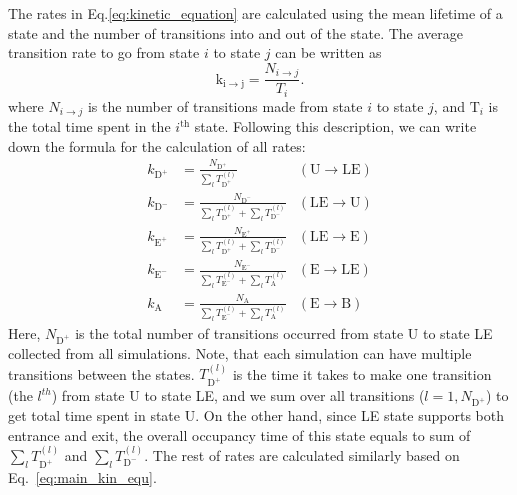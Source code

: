 \documentclass[../talant.diss.submit.tex]{subfiles}
\begin{document}
The rates in Eq.\ref{eq:kinetic_equation} are calculated using the mean lifetime of a state and the number
of transitions into and out of the state. 
The average transition rate to go from state $i$ to state $j$ can be written as 
%
\begin{equation}
  \label{eq:main_kin_equ}
  \mathrm{k_{i \rightarrow j}} = %
  \frac{N_{i \rightarrow j}}{T_i}.
\end{equation}
where $N_{i \rightarrow j}$ is the number of transitions made from state $i$ to state $j$,
and $\mathrm{T}_{i}$ is the total time spent in the $i^\mathrm{th}$ state. 
Following this description, we can write down the formula for the calculation of all rates:
%
\begin{align}
  \label{eq:Dplus}
  k_{\mathrm{D^{+}}} &= \frac{N_{\mathrm{D}^{+}}}{\sum_l T_{\mathrm{D}^+}^{(l)}}
  & (\mathrm{U \rightarrow LE}) \\%
  \label{eq:Dminus}
  k_{\mathrm{{D^{-}}}} &= \frac{N_{\mathrm{D}^{-}}}{\sum_l T_{\mathrm{D}^+}^{(l)} +
    \sum_l T_{\mathrm{D}^-}^{(l)}}
  & (\mathrm{LE \rightarrow U})\\    %
  \label{eq:Eplus}
  k_{\mathrm{E^{+}}} &= \frac{N_{\mathrm{E}^{+}}}{\sum_l T_{\mathrm{D}^+}^{(l)} +
    \sum_l T_{\mathrm{D}^-}^{(l)}}
  &  (\mathrm{LE \rightarrow E}) \\ %
  \label{eq:Eminus}
  k_{\mathrm{{E^{-}}}}  &= \frac{N_{\mathrm{E}^{-}}}{\sum_l T_{\mathrm{E}^{-}}^{(l)} +
    \sum_l T_{\mathrm{A}}^{(l)}}
  & (\mathrm{E \rightarrow LE})\\  %
  \label{eq:A}
  k_{\mathrm{{A}}} &=  \frac{N_{\mathrm{A}}}{\sum_l T_{\mathrm{E}^{-}}^{(l)} +
    \sum_l T_{\mathrm{A}}^{(l)}}
  & (\mathrm{E \rightarrow B}) %
\end{align}
%
Here, $N_{\mathrm{D}^+}$ is the total number of transitions occurred from state U to state LE collected
from all simulations. Note, that each simulation can have multiple transitions between the states.
$T_{\mathrm{D}^+}^{(l)}$ is the time it takes to make one transition (the $l^{th}$) from state U
to state LE,
and we sum over all transitions ($l = {1,N_{\mathrm{D}^+}}$) to get total time spent in state U.
On the other hand, since LE state supports both entrance and exit, the overall occupancy time of this
state equals to sum of $\sum_l T_{\mathrm{D}^+}^{(l)}$ and $\sum_l T_{\mathrm{D}^-}^{(l)}$. The rest of rates
are calculated similarly based on Eq.~\ref{eq:main_kin_equ}.
\end{document}
